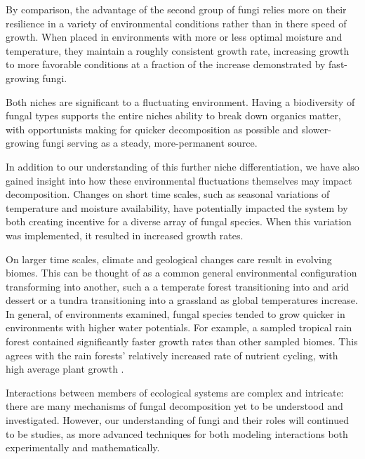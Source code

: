 \documentclass[12pt]{article}
\begin{document}
\begin{multicols}{2}
By comparison, the advantage of the second group of fungi relies more on their resilience in a variety of environmental conditions rather than in there speed of growth. When placed in environments with more or less optimal moisture and temperature, they maintain a roughly consistent growth rate, increasing growth to more favorable conditions at a fraction of the increase demonstrated by fast-growing fungi.

Both niches are significant to a fluctuating environment. Having a biodiversity of fungal types supports the entire niches ability to break down organics matter, with opportunists making for quicker decomposition as possible and slower-growing fungi serving as a steady, more-permanent  source.

In addition to our understanding of this further niche differentiation, we have also gained insight into how these environmental fluctuations themselves may impact decomposition. Changes on short time scales, such as seasonal variations of temperature and moisture availability, have potentially impacted the system by both creating incentive for a diverse array of fungal species. When this variation was implemented, it resulted in increased growth rates.

On larger time scales, climate and geological changes care result in evolving biomes. This can be thought of as a common general environmental configuration transforming into another, such a a temperate forest transitioning into and arid dessert or a tundra transitioning into a grassland as global temperatures increase. In general, of environments examined, fungal species tended to grow quicker in environments with higher water potentials. For example, a sampled tropical rain forest contained significantly faster growth rates than other sampled biomes. This agrees with the rain forests' relatively increased rate of nutrient cycling, with high average plant growth \cite{Lodge1993}.

Interactions between members of ecological systems are complex and intricate: there are many mechanisms of fungal decomposition yet to be understood and investigated. However, our understanding of fungi and their roles will continued to be studies, as more advanced techniques for both modeling interactions both experimentally and mathematically.


\end{multicols}
\end{document}
